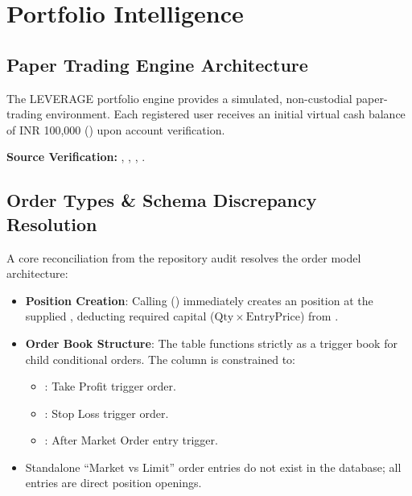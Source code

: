 \chapter{Portfolio Intelligence}
\label{ch:portfolio_intelligence}

\section{Paper Trading Engine Architecture}
The LEVERAGE portfolio engine provides a simulated, non-custodial paper-trading environment. Each registered user receives an initial virtual cash balance of INR 100,000 () upon account verification.

\begin{citationbox}
\textbf{Source Verification:} , , , .
\end{citationbox}

\section{Order Types \& Schema Discrepancy Resolution}
A core reconciliation from the repository audit resolves the order model architecture:
\begin{itemize}[leftmargin=6mm,itemsep=1.5mm]
    \item \textbf{Position Creation}: Calling  () immediately creates an  position at the supplied , deducting required capital ($\mathrm{Qty} \times \mathrm{EntryPrice}$) from  .
    \item \textbf{Order Book Structure}: The  table functions strictly as a trigger book for child conditional orders. The  column is constrained to:
    \begin{itemize}[leftmargin=4mm]
        \item {}: Take Profit trigger order.
        \item {}: Stop Loss trigger order.
        \item {}: After Market Order entry trigger.
    \end{itemize}
    \item Standalone ``Market vs Limit'' order entries do not exist in the database; all entries are direct position openings.
\end{itemize}

